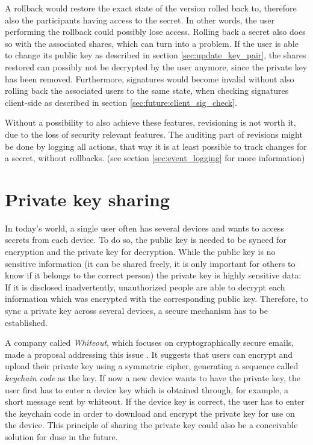 A rollback would restore the exact state of the version rolled back to,
therefore also the participants having access to the secret. In other words,
the user performing the rollback could possibly lose access. Rolling back a
secret also does so with the associated shares, which can turn into a problem.
If the user is able to change its public key as described in section
\ref{sec:update_key_pair}, the shares restored can possibly not be decrypted by
the user anymore, since the private key has been removed. Furthermore,
signatures would become invalid without also rolling back the associated users
to the same state, when checking signatures client-side as described in section
\ref{sec:future:client_sig_check}.

Without a possibility to also achieve these features, revisioning is not worth
it, due to the loss of security relevant features. The auditing part of
revisions might be done by logging all actions, that way it is at least
possible to track changes for a secret, without rollbacks. (see section
\ref{sec:event_logging} for more information)

\section{Private key sharing}

In today's world, a single user often has several devices and wants to access
secrets from each device. To do so, the public key is needed to be synced for
encryption and the private key for decryption. While the public key is no
sensitive information (it can be shared freely, it is only important for others
to know if it belongs to the correct person) the private key is highly sensitive
data: If it is disclosed inadvertently, unauthorized people are able to decrypt
each information which was encrypted with the corresponding public key. Therefore,
to sync a private key across several devices, a secure mechanism has to be
established.

A company called \textit{Whiteout}, which focuses on cryptographically secure
emails, made a proposal addressing this issue \cite{whiteout_pgp_sync}. It
suggests that users can encrypt and upload their private key using a symmetric
cipher, generating a sequence called \textit{keychain code} as the key.
If now a new device wants to have the private key, the user first has to enter
a device key which is obtained through, for example, a short message sent by
whiteout. If the device key is correct, the user has to enter the keychain code
in order to download and encrypt the private key for use on the device.
This principle of sharing the private key could also be a conceivable solution
for duse in the future. \cite{whiteout_pgp_sync}

